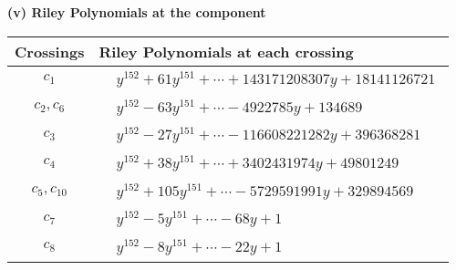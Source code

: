\documentclass[1p]{elsarticle_modified}
\theoremstyle{definition}
\begin{document}
\newpage\renewcommand{\arraystretch}{1}
\flushleft \textbf{(v) Riley Polynomials at the component}\newline \\
\begin{tabular}{m{50pt}|m{274pt}}
Crossings & \hspace{64pt}Riley Polynomials at each crossing \\
\hline $$\begin{aligned}c_{1}\end{aligned}$$&$\begin{aligned}
&y^{152}+61 y^{151}+\cdots+143171208307 y+18141126721
\end{aligned}$\\
\hline $$\begin{aligned}c_{2},c_{6}\end{aligned}$$&$\begin{aligned}
&y^{152}-63 y^{151}+\cdots-4922785 y+134689
\end{aligned}$\\
\hline $$\begin{aligned}c_{3}\end{aligned}$$&$\begin{aligned}
&y^{152}-27 y^{151}+\cdots-116608221282 y+396368281
\end{aligned}$\\
\hline $$\begin{aligned}c_{4}\end{aligned}$$&$\begin{aligned}
&y^{152}+38 y^{151}+\cdots+3402431974 y+49801249
\end{aligned}$\\
\hline $$\begin{aligned}c_{5},c_{10}\end{aligned}$$&$\begin{aligned}
&y^{152}+105 y^{151}+\cdots-5729591991 y+329894569
\end{aligned}$\\
\hline $$\begin{aligned}c_{7}\end{aligned}$$&$\begin{aligned}
&y^{152}-5 y^{151}+\cdots-68 y+1
\end{aligned}$\\
\hline $$\begin{aligned}c_{8}\end{aligned}$$&$\begin{aligned}
&y^{152}-8 y^{151}+\cdots-22 y+1
\end{aligned}$\\

\end{tabular}
\end{document}
